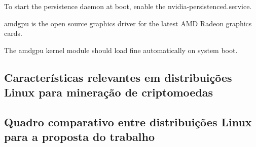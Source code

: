 \documentclass[
	article,			%
	12pt,				%
	openright,			%
	oneside,			%
	a4paper,			%
	chapter=TITLE,		%
	section=TITLE,		%
	subsection=TITLE,	%
	subsubsection=TITLE,%
	subsubsubsection=TITLE, %
	english,			%
	brazil,				%
	]{abntex2}
\begin{document}
\cite{NVidia2017}

To start the persistence daemon at boot, enable the nvidia-persistenced.service.

\cite{ArchWiki2018}


amdgpu is the open source graphics driver for the latest AMD Radeon graphics cards.

The amdgpu kernel module should load fine automatically on system boot. 

\cite{ArchWiki2018e}

\subsection{Características relevantes em distribuições Linux para mineração de criptomoedas}

\subsection{Quadro comparativo entre distribuições Linux para a proposta do trabalho}









%
%
\end{document}
